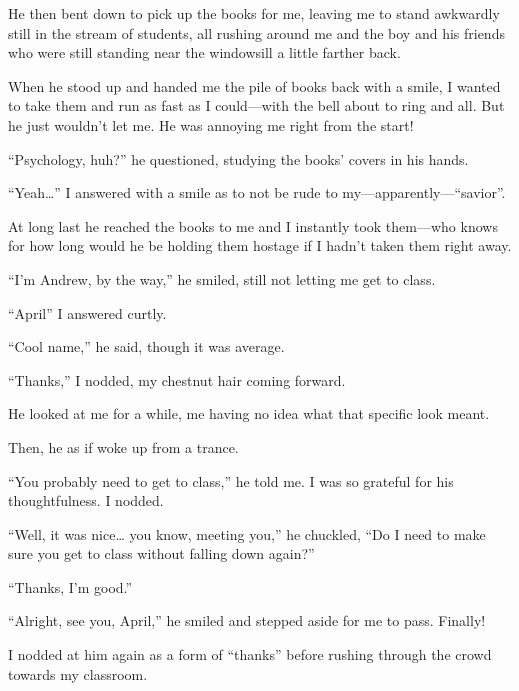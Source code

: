 He then bent down to pick up the books for me, leaving me to stand awkwardly still in the stream of students, all rushing around me and the boy and his friends who were still standing near the windowsill a little farther back.

When he stood up and handed me the pile of books back with a smile, I wanted to take them and run as fast as I could—with the bell about to ring and all. But he just wouldn’t let me. He was annoying me right from the start!

“Psychology, huh?” he questioned, studying the books’ covers in his hands.

“Yeah…” I answered with a smile as to not be rude to my—apparently—“savior”.

At long last he reached the books to me and I instantly took them—who knows for how long would he be holding them hostage if I hadn’t taken them right away.

“I’m Andrew, by the way,” he smiled, still not letting me get to class.

“April” I answered curtly.

“Cool name,” he said, though it was average.

“Thanks,” I nodded, my chestnut hair coming forward.

He looked at me for a while, me having no idea what that specific look meant.

Then, he as if woke up from a trance.

“You probably need to get to class,” he told me. I was so grateful for his thoughtfulness. I nodded.

“Well, it was nice… you know, meeting you,” he chuckled, “Do I need to make sure you get to class without falling down again?”

“Thanks, I’m good.”

“Alright, see you, April,” he smiled and stepped aside for me to pass. Finally!

I nodded at him again as a form of “thanks” before rushing through the crowd towards my classroom.